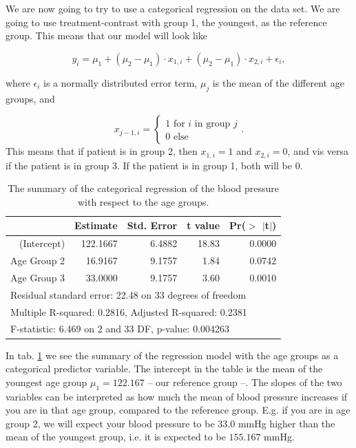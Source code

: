 \documentclass[a4paper,norsk, 10pt]{article}
\begin{document}
We are now going to try to use a categorical regression on the data set. We are going to use treatment-contrast with group 1, the youngest, as the reference group. This means that our model will look like

\begin{equation}
y_i = \mu_1 + (\mu_2-\mu_1)\cdot x_{1,i} + (\mu_2-\mu_1)\cdot x_{2,i} + \epsilon_i,
\end{equation}

where $\epsilon_i$ is a normally distributed error term, $\mu_j$ is the mean of the different age groups, and

\begin{equation}
x_{j-1,i} = 
\begin{cases}
1 \text{	for $i$ in group $j$} \\
0 \text{	else}
\end{cases}.
\end{equation}
This means that if patient is in group 2, then $x_{1,i} = 1$ and $x_{2,i} = 0$, and vis versa if the patient is in group 3. If the patient is in group 1, both will be $0$.

\begin{table}[!htbp]
\centering
\begin{tabular}{rrrrr}
  \hline
 & Estimate & Std. Error & t value & Pr($>$ $|$t$|$) \\ 
  \hline
(Intercept) & 122.1667 & 6.4882 & 18.83 & 0.0000 \\ 
  Age Group 2 & 16.9167 & 9.1757 & 1.84 & 0.0742 \\ 
  Age Group 3 & 33.0000 & 9.1757 & 3.60 & 0.0010 \\ 
  \hline
   \multicolumn{5}{l}{Residual standard error: 22.48 on 33 degrees of freedom} \\
	\multicolumn{5}{l}{Multiple R-squared:  0.2816,	Adjusted R-squared:  0.2381} \\
	\multicolumn{5}{l}{F-statistic: 6.469 on 2 and 33 DF,  p-value: 0.004263} \\
   \hline
\end{tabular}
\caption{The summary of the categorical regression of the blood pressure with respect to the age groups.}\label{tab:blood_reg}
\end{table}

In tab. \ref{tab:blood_reg} we see the summary of the regression model with the age groups as a categorical predictor variable. The intercept in the table is the mean of the youngest age group $\mu_1 = 122.167$ --  our reference group --. The slopes of the two variables can be interpreted as how much the mean of blood pressure increases if you are in that age group, compared to the reference group. E.g. if you are in age group 2, we will expect your blood pressure to be $33.0$ mmHg higher than the mean of the youngest group, i.e. it is expected to be $155.167$ mmHg.
\end{document}
